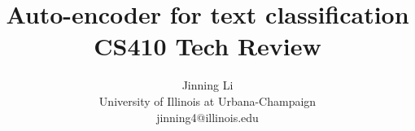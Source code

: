 \documentclass{article}
\title{Auto-encoder for text classification \\
		\Large{CS410 Tech Review}}
\author{Jinning Li\\
{\small University of Illinois at Urbana-Champaign}\\
{\small jinning4@illinois.edu}}
\begin{document}
\maketitle

\begin{abstract}

\end{abstract}




\end{document}
